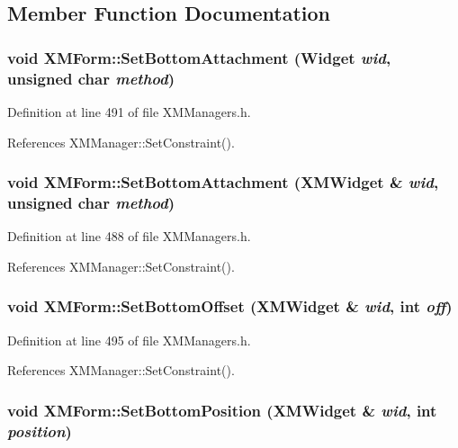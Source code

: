 \subsection{Member Function Documentation}
\subsubsection{\setlength{\rightskip}{0pt plus 5cm}void XMForm::Set\-Bottom\-Attachment (Widget {\em wid}, unsigned char {\em method})\hspace{0.3cm}{\tt  [inline]}}\label{classXMForm_a10}




Definition at line 491 of file XMManagers.h.

References XMManager::Set\-Constraint().
\subsubsection{\setlength{\rightskip}{0pt plus 5cm}void XMForm::Set\-Bottom\-Attachment ({\bf XMWidget} \& {\em wid}, unsigned char {\em method})\hspace{0.3cm}{\tt  [inline]}}\label{classXMForm_a9}




Definition at line 488 of file XMManagers.h.

References XMManager::Set\-Constraint().
\subsubsection{\setlength{\rightskip}{0pt plus 5cm}void XMForm::Set\-Bottom\-Offset ({\bf XMWidget} \& {\em wid}, int {\em off})\hspace{0.3cm}{\tt  [inline]}}\label{classXMForm_a11}




Definition at line 495 of file XMManagers.h.

References XMManager::Set\-Constraint().
\subsubsection{\setlength{\rightskip}{0pt plus 5cm}void XMForm::Set\-Bottom\-Position ({\bf XMWidget} \& {\em wid}, int {\em position})\hspace{0.3cm}{\tt  [inline]}}\label{classXMForm_a12}




